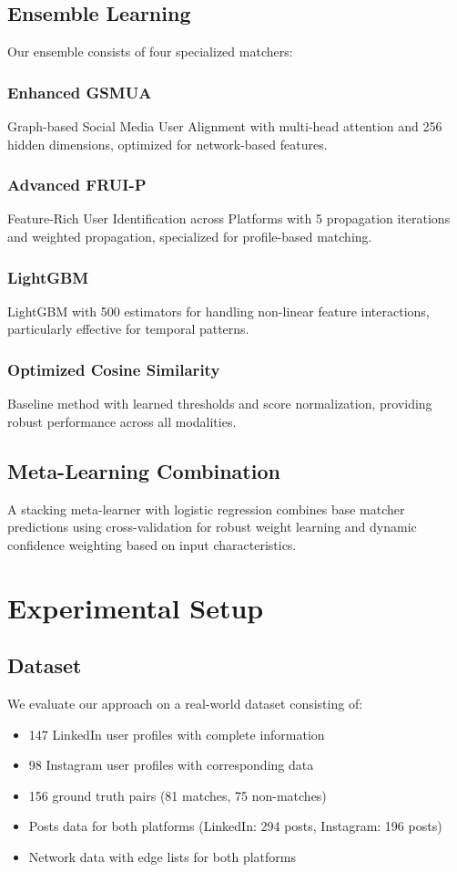 \documentclass[conference]{IEEEtran}
\begin{document}
\subsection{Ensemble Learning}

Our ensemble consists of four specialized matchers:

\subsubsection{Enhanced GSMUA}
Graph-based Social Media User Alignment with multi-head attention and 256 hidden dimensions, optimized for network-based features.

\subsubsection{Advanced FRUI-P}
Feature-Rich User Identification across Platforms with 5 propagation iterations and weighted propagation, specialized for profile-based matching.

\subsubsection{LightGBM}
LightGBM \cite{ke2017lightgbm} with 500 estimators for handling non-linear feature interactions, particularly effective for temporal patterns.

\subsubsection{Optimized Cosine Similarity}
Baseline method with learned thresholds and score normalization, providing robust performance across all modalities.

\subsection{Meta-Learning Combination}
A stacking meta-learner with logistic regression combines base matcher predictions using cross-validation for robust weight learning and dynamic confidence weighting based on input characteristics.

\section{Experimental Setup}

\subsection{Dataset}
We evaluate our approach on a real-world dataset consisting of:
\begin{itemize}
\item 147 LinkedIn user profiles with complete information
\item 98 Instagram user profiles with corresponding data
\item 156 ground truth pairs (81 matches, 75 non-matches)
\item Posts data for both platforms (LinkedIn: 294 posts, Instagram: 196 posts)
\item Network data with edge lists for both platforms
\end{itemize}
\end{document}
